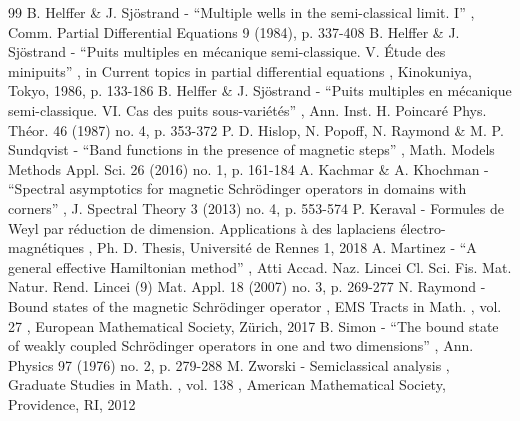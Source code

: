 \begin{thebibliography}{99}
 B. Helffer \& J. Sjöstrand - “Multiple wells in the semi-classical limit. I” , Comm. Partial Differential Equations 9 (1984), p. 337-408
 B. Helffer \& J. Sjöstrand - “Puits multiples en mécanique semi-classique. V. Étude des minipuits” , in Current topics in partial differential equations , Kinokuniya, Tokyo, 1986, p. 133-186
 B. Helffer \& J. Sjöstrand - “Puits multiples en mécanique semi-classique. VI. Cas des puits sous-variétés” , Ann. Inst. H. Poincaré Phys. Théor. 46 (1987) no. 4, p. 353-372
 P. D. Hislop, N. Popoff, N. Raymond \& M. P. Sundqvist - “Band functions in the presence of magnetic steps” , Math. Models Methods Appl. Sci. 26 (2016) no. 1, p. 161-184
 A. Kachmar \& A. Khochman - “Spectral asymptotics for magnetic Schrödinger operators in domains with corners” , J. Spectral Theory 3 (2013) no. 4, p. 553-574
 P. Keraval - Formules de Weyl par réduction de dimension. Applications à des laplaciens électro-magnétiques , Ph. D. Thesis, Université de Rennes 1, 2018
 A. Martinez - “A general effective Hamiltonian method” , Atti Accad. Naz. Lincei Cl. Sci. Fis. Mat. Natur. Rend. Lincei (9) Mat. Appl. 18 (2007) no. 3, p. 269-277
 N. Raymond - Bound states of the magnetic Schrödinger operator , EMS Tracts in Math. , vol. 27 , European Mathematical Society, Zürich, 2017
 B. Simon - “The bound state of weakly coupled Schrödinger operators in one and two dimensions” , Ann. Physics 97 (1976) no. 2, p. 279-288
 M. Zworski - Semiclassical analysis , Graduate Studies in Math. , vol. 138 , American Mathematical Society, Providence, RI, 2012
\end{thebibliography}
